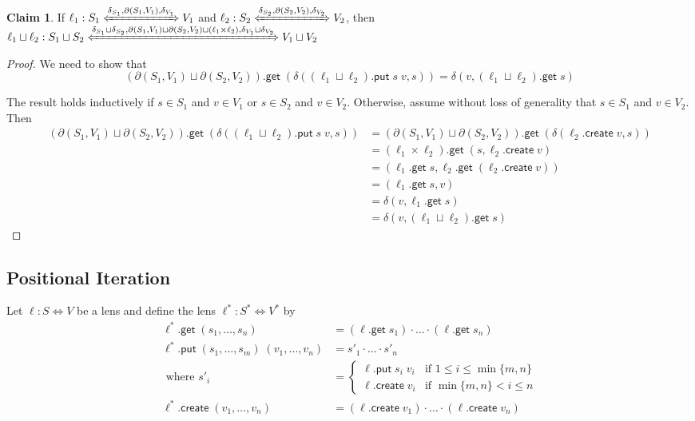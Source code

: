 \documentclass[acmsmall,review,anonymous]{acmart}\settopmatter{printfolios=true,printccs=false,printacmref=false}
\theoremstyle{definition}
\newtheorem{claim}{Claim}
\newcommand{\kw}[1]{\ensuremath{\mathsf{#1}}\xspace}
\newcommand{\get}{\ensuremath{\kw{get}}\xspace}
\newcommand{\pput}{\ensuremath{\kw{put}}\xspace}
\newcommand{\create}{\ensuremath{\kw{create}}\xspace}
\begin{document}
\begin{claim}
If $\ell_1 : S_1  \xLeftrightarrow{\delta_{S_1}, \partial (S_1, V_1),
\delta_{V_1}} V_1$ and $\ell_2 : S_2 \xLeftrightarrow{\delta_{S_2}, \partial
(S_2, V_2), \delta_{V_2}} V_2$, then \\
$\ell_1 \sqcup \ell_2 : S_1 \sqcup S_2 \xLeftrightarrow{\delta_{S_1} \sqcup
\delta_{S_2}, \partial (S_1, V_1) \sqcup \partial (S_2, V_2) \sqcup (\ell_1
\times \ell_2), \delta_{V_1} \sqcup \delta_{V_2}} V_1 \sqcup V_2$
\end{claim}
\begin{proof}
We need to show that
$$(\partial (S_1, V_1) \sqcup \partial (S_2, V_2)).\get \;
(\delta((\ell_1 \sqcup \ell_2).\pput \; s \; v, s)) = \delta(v, (\ell_1 \sqcup
\ell_2).\get \; s)$$

The result holds inductively if $s \in S_1$ and $v \in V_1$ or $s \in S_2$ and
$v \in V_2$. Otherwise, assume without loss of generality
that $s \in S_1$ and $v \in V_2$. Then
\begin{align*}
(\partial (S_1, V_1) \sqcup \partial (S_2, V_2)).\get \;
(\delta((\ell_1 \sqcup \ell_2).\pput \; s \; v, s)) &=
(\partial (S_1, V_1) \sqcup \partial (S_2, V_2)).\get \; (\delta(\ell_2.\create
\; v, s))\\
&= (\ell_1 \times \ell_2).\get \; (s, \ell_2.\create \; v)\\
&= (\ell_1.\get \; s, \ell_2.\get \; (\ell_2.\create \; v))\\
&= (\ell_1.\get \; s, v)\\
&= \delta(v, \ell_1.\get \; s)\\
&= \delta(v, (\ell_1 \sqcup \ell_2).\get \; s)
\end{align*}
\end{proof}
\subsection{Positional Iteration}
Let $\ell : S \Leftrightarrow V$ be a lens and define the lens $\ell^*:
S^* \Leftrightarrow V^*$ by
\begin{align*}
\ell^* .\get \; (s_1, \ldots, s_n) &= (\ell.\get \; s_1) \cdot \ldots
\cdot (\ell.\get \; s_n)\\
\ell^*.\pput \; (s_1, \ldots, s_m) \; (v_1, \ldots, v_n) &= s'_1 \cdot
\ldots \cdot s'_n\\
\text{ where } s'_i &= \begin{cases}
\ell.\pput \; s_i \; v_i & \text{if } 1 \leq i \leq \min\{m, n\}\\
\ell.\create \; v_i & \text{if } \min\{m, n\} < i \leq n
\end{cases}\\
\ell^*.\create \; (v_1, \ldots, v_n) &= (\ell.\create \; v_1) \cdot \ldots
\cdot (\ell.\create \; v_n)
\end{align*}
\end{document}
